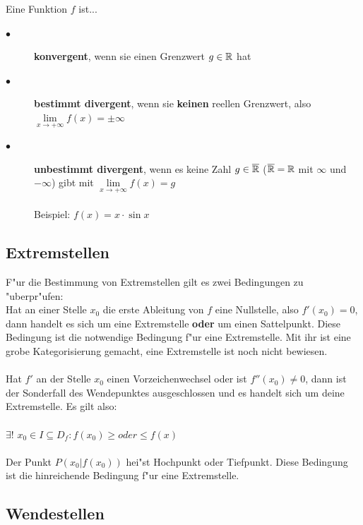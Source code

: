 \begin{Bemerkung}
Eine Funktion $f$ ist...
\begin{description}
\item[$\bullet$] \textbf{konvergent}, wenn sie einen Grenzwert $g\in\mathbb{R}$ hat
\item[$\bullet$] \textbf{bestimmt divergent}, wenn sie  \textbf{keinen} reellen Grenzwert, also $\lim\limits_{x \rightarrow +\infty}{f(x)} = \pm \infty$
\item[$\bullet$] \textbf{unbestimmt divergent}, wenn es keine Zahl $g\in\overline{\mathbb{R}}$ ($\overline{\mathbb{R}} = \mathbb{R}$ mit $\infty$ und $-\infty$) gibt mit $\lim\limits_{x \rightarrow +\infty}{f(x)} = g$\\\\
Beispiel: $f(x)=x\cdot\sin{x}$
\end{description}
\end{Bemerkung}


\subsection{Extremstellen}

F"ur die Bestimmung von Extremstellen gilt es zwei Bedingungen zu "uberpr"ufen:\\

Hat an einer Stelle $x_{0}$ die erste Ableitung von $f$ eine Nullstelle, also $f'(x_{0}) = 0$, dann handelt es sich um eine Extremstelle \textbf{oder} um einen Sattelpunkt. Diese Bedingung ist die notwendige Bedingung f"ur eine Extremstelle. Mit ihr ist eine grobe Kategorisierung gemacht, eine Extremstelle ist noch nicht bewiesen.  \\\\

Hat $f'$ an der Stelle $x_{0}$ einen Vorzeichenwechsel oder ist $f''(x_{0})\neq 0$, dann ist der Sonderfall des Wendepunktes ausgeschlossen und es handelt sich um deine Extremstelle. Es gilt also: \\\\ $\exists! $ $ x_{0} \in I \subseteq D_{f} : f(x_{0}) \geq oder \leq f(x) $ \\\\ Der Punkt $P(x_{0}|f(x_{0}))$ hei"st Hochpunkt oder Tiefpunkt. Diese Bedingung ist die hinreichende Bedingung f"ur eine Extremstelle.

\subsection{Wendestellen}

